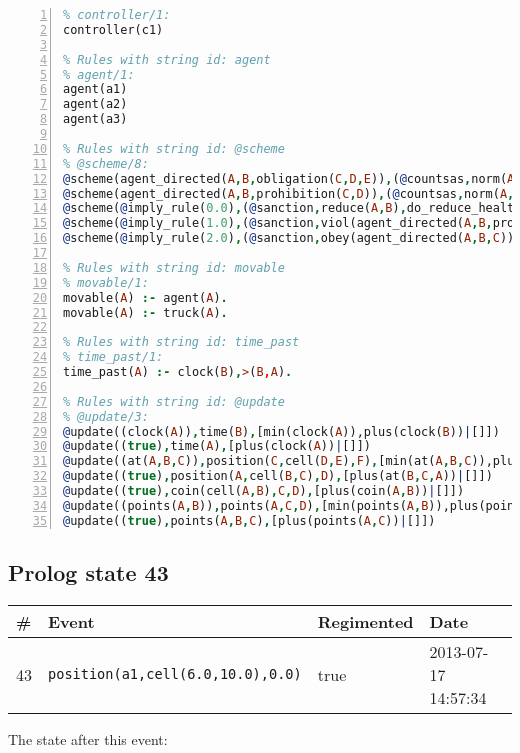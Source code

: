 \documentclass[11pt]{article}\usepackage[utf8]{inputenc}\usepackage{geometry}
\begin{document}
\begin{lstlisting}[language=Prolog, numbers=left]
% Rules with string id: controller
% controller/1:
controller(c1)

% Rules with string id: agent
% agent/1:
agent(a1)
agent(a2)
agent(a3)

% Rules with string id: @scheme
% @scheme/8:
@scheme(agent_directed(A,B,obligation(C,D,E)),(@countsas,norm(A,B,F,obligation(C,D,E)),F),false,(listTrue(C)),(time_past(D)),false,[plus(viol(agent_directed(A,B,obligation(C,D,E))))|[]],[plus(obey(agent_directed(A,B,obligation(C,D,E))))|[]])
@scheme(agent_directed(A,B,prohibition(C,D)),(@countsas,norm(A,B,E,prohibition(C,D)),E),(listTrue(C)),false,(false),false,[plus(viol(agent_directed(A,B,prohibition(C,D))))|[]],[plus(obey(agent_directed(A,B,prohibition(C,D))))|[]])
@scheme(@imply_rule(0.0),(@sanction,reduce(A,B),do_reduce_health(A,B),notifyAgent(A,changed(status))),true,false,false,false,[min(reduce(A,B))|[]],[])
@scheme(@imply_rule(1.0),(@sanction,viol(agent_directed(A,B,prohibition(C,D))),do_sanction(D)),true,false,false,false,[min(viol(agent_directed(A,B,prohibition(C,D))))|[]],[])
@scheme(@imply_rule(2.0),(@sanction,obey(agent_directed(A,B,C))),true,false,false,false,[min(obey(agent_directed(A,B,C)))|[]],[])

% Rules with string id: movable
% movable/1:
movable(A) :- agent(A).
movable(A) :- truck(A).

% Rules with string id: time_past
% time_past/1:
time_past(A) :- clock(B),>(B,A).

% Rules with string id: @update
% @update/3:
@update((clock(A)),time(B),[min(clock(A)),plus(clock(B))|[]])
@update((true),time(A),[plus(clock(A))|[]])
@update((at(A,B,C)),position(C,cell(D,E),F),[min(at(A,B,C)),plus(at(D,E,C))|[]])
@update((true),position(A,cell(B,C),D),[plus(at(B,C,A))|[]])
@update((true),coin(cell(A,B),C,D),[plus(coin(A,B))|[]])
@update((points(A,B)),points(A,C,D),[min(points(A,B)),plus(points(A,D))|[]])
@update((true),points(A,B,C),[plus(points(A,C))|[]])

\end{lstlisting}
\clearpage 
\subsection{Prolog state 43}
\begin{table}[ht]
\centering 
\begin{tabular}{l l l l} 
\textbf{\#} & \textbf{Event} & \textbf{Regimented} & \textbf{Date} \\ [0.5ex] 
\hline
43&\texttt{position(a1,cell(6.0,10.0),0.0)}&true&2013-07-17 14:57:34\\ [1ex] \hline\end{tabular}
\end{table}
The state after this event:
\end{document}
